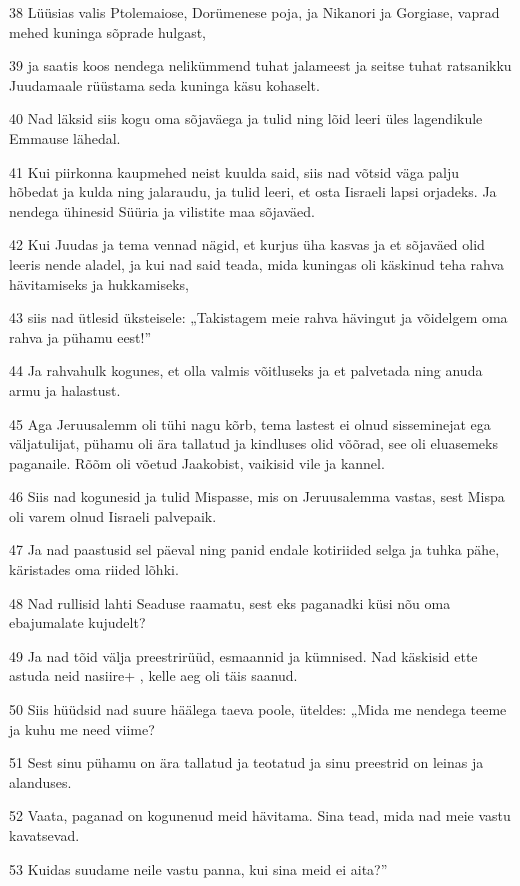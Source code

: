 \par 38 Lüüsias valis Ptolemaiose, Dorümenese poja, ja Nikanori ja Gorgiase, vaprad mehed kuninga sõprade hulgast,
\par 39 ja saatis koos nendega nelikümmend tuhat jalameest ja seitse tuhat ratsanikku Juudamaale rüüstama seda kuninga käsu kohaselt.
\par 40 Nad läksid siis kogu oma sõjaväega ja tulid ning lõid leeri üles lagendikule Emmause lähedal.
\par 41 Kui piirkonna kaupmehed neist kuulda said, siis nad võtsid väga palju hõbedat ja kulda ning jalaraudu, ja tulid leeri, et osta Iisraeli lapsi orjadeks. Ja nendega ühinesid Süüria ja vilistite maa sõjaväed.
\par 42 Kui Juudas ja tema vennad nägid, et kurjus üha kasvas ja et sõjaväed olid leeris nende aladel, ja kui nad said teada, mida kuningas oli käskinud teha rahva hävitamiseks ja hukkamiseks,
\par 43 siis nad ütlesid üksteisele: „Takistagem meie rahva hävingut ja võidelgem oma rahva ja pühamu eest!”
\par 44 Ja rahvahulk kogunes, et olla valmis võitluseks ja et palvetada ning anuda armu ja halastust.
\par 45 Aga Jeruusalemm oli tühi nagu kõrb, tema lastest ei olnud sisseminejat ega väljatulijat, pühamu oli ära tallatud ja kindluses olid võõrad, see oli eluasemeks paganaile. Rõõm oli võetud Jaakobist, vaikisid vile ja kannel.
\par 46 Siis nad kogunesid ja tulid Mispasse, mis on Jeruusalemma vastas, sest Mispa oli varem olnud Iisraeli palvepaik.
\par 47 Ja nad paastusid sel päeval ning panid endale kotiriided selga ja tuhka pähe, käristades oma riided lõhki.
\par 48 Nad rullisid lahti Seaduse raamatu, sest eks paganadki küsi nõu oma ebajumalate kujudelt?
\par 49 Ja nad tõid välja preestrirüüd, esmaannid ja kümnised. Nad käskisid ette astuda neid nasiire+ , kelle aeg oli täis saanud.
\par 50 Siis hüüdsid nad suure häälega taeva poole, üteldes: „Mida me nendega teeme ja kuhu me need viime?
\par 51 Sest sinu pühamu on ära tallatud ja teotatud ja sinu preestrid on leinas ja alanduses.
\par 52 Vaata, paganad on kogunenud meid hävitama. Sina tead, mida nad meie vastu kavatsevad.
\par 53 Kuidas suudame neile vastu panna, kui sina meid ei aita?”
